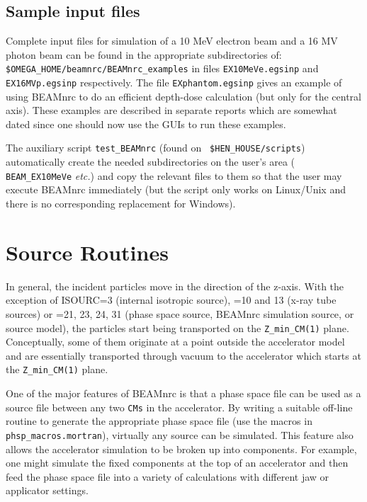 \documentclass[12pt,twoside]{article}
\newcommand{\etc}{{\em etc.}}
\begin{document}
\subsection{Sample input files}
 

Complete input files for simulation of a 10 MeV electron beam and a 16 MV
photon beam can be found in the appropriate subdirectories of:\\
\verb+$OMEGA_HOME/beamnrc/BEAMnrc_examples+
in files \verb+EX10MeVe.egsinp+ and \verb+EX16MVp.egsinp+
respectively. The file \verb+EXphantom.egsinp+ gives an example
of using BEAMnrc to do an efficient depth-dose calculation (but only for
the central axis).  These examples are described in
separate reports\cite{SR95,ZR95,WR95} which are somewhat dated since one
should now use the GUIs to run these examples.

The auxiliary script \verb+test_BEAMnrc+ (found on {\tt
\$HEN\_HOUSE/scripts})
automatically create the needed subdirectories on the user's area ({\tt
BEAM\_EX10MeVe} \etc) and
copy the relevant files to them so that the user may execute BEAMnrc
immediately (but the script only works on Linux/Unix and there is
no corresponding replacement for Windows).

\section{Source Routines}

In general, the incident particles move in the direction of the z-axis.  With
the exception of ISOURC=3 (internal isotropic source), =10 and 13 (x-ray
tube sources)  or =21, 23, 24, 31 (phase space source, BEAMnrc simulation source, or
source model), the particles start being transported on the \verb+Z_min_CM(1)+
plane.  Conceptually, some of them originate at a point outside the accelerator
model and are essentially transported through vacuum to the accelerator
which starts at the \verb+Z_min_CM(1)+ plane.

One of the major features of BEAMnrc is that a
phase space file can be used as a source file between
any two  \verb+CMs+ in the accelerator. By writing a suitable off-line routine
to generate the appropriate phase space file
(use the macros in {\tt phsp\_macros.mortran}),
virtually any source can be simulated.  This feature also allows the accelerator
simulation to be broken up into components. For example, one might
simulate the fixed components at the top of an accelerator and then feed
the phase space file into a variety of calculations with different jaw
or applicator settings.
\end{document}
